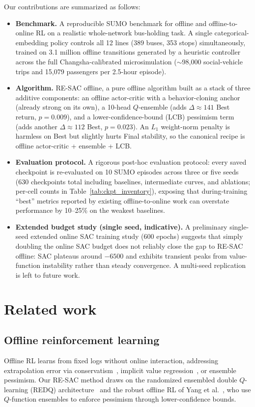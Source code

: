 \documentclass[journal,10pt]{IEEEtran}
\begin{document}
Our contributions are summarized as follows:
\begin{itemize}
  \item \textbf{Benchmark.} A reproducible SUMO benchmark for offline and offline-to-online RL on a realistic whole-network bus-holding task. A single categorical-embedding policy controls all 12 lines (389 buses, 353 stops) simultaneously, trained on 3.1 million offline transitions generated by a heuristic controller across the full Changsha-calibrated microsimulation ($\sim$98{,}000 social-vehicle trips and 15{,}079 passengers per 2.5-hour episode).
  \item \textbf{Algorithm.} RE-SAC offline, a pure offline algorithm built as a stack of three additive components: an offline actor-critic with a behavior-cloning anchor (already strong on its own), a 10-head $Q$-ensemble (adds $\Delta\!\approx\!141$ Best return, $p\!=\!0.009$), and a lower-confidence-bound (LCB) pessimism term (adds another $\Delta\!\approx\!112$ Best, $p\!=\!0.023$). An $L_1$ weight-norm penalty is harmless on Best but slightly hurts Final stability, so the canonical recipe is offline actor-critic + ensemble + LCB.
  \item \textbf{Evaluation protocol.} A rigorous post-hoc evaluation protocol: every saved checkpoint is re-evaluated on 10 SUMO episodes across three or five seeds (630 checkpoints total including baselines, intermediate curves, and ablations; per-cell counts in Table~\ref{tab:ckpt_inventory}), exposing that during-training ``best'' metrics reported by existing offline-to-online work can overstate performance by 10--25\% on the weakest baselines.
  \item \textbf{Extended budget study (single seed, indicative).} A preliminary single-seed extended online SAC training study (600 epochs) suggests that simply doubling the online SAC budget does not reliably close the gap to RE-SAC offline: SAC plateaus around $-6500$ and exhibits transient peaks from value-function instability rather than steady convergence. A multi-seed replication is left to future work.
\end{itemize}

\section{Related work}
\label{sec:related}

\subsection{Offline reinforcement learning}
Offline RL learns from fixed logs without online interaction, addressing extrapolation error via conservatism~\cite{kumar2020conservative}, implicit value regression~\cite{kostrikov2022offline}, or ensemble pessimism. Our RE-SAC method draws on the randomized ensembled double $Q$-learning (REDQ) architecture~\cite{chen2021randomized} and the robust offline RL of Yang et al.~\cite{yang2022rorl}, who use $Q$-function ensembles to enforce pessimism through lower-confidence bounds.
\end{document}
